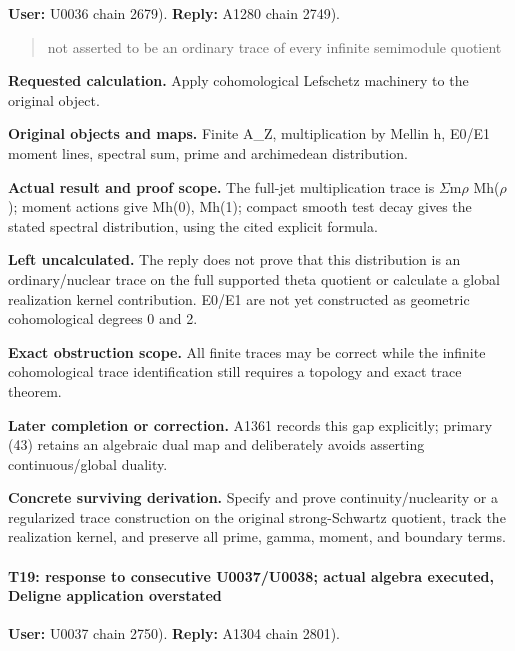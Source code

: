 \textbf{User:} U0036
\protect{} chain 2679).
\textbf{Reply:} A1280
\protect{} chain 2749).

\begin{quote}
not asserted to be an ordinary trace of every infinite semimodule
quotient
\end{quote}

\textbf{Requested calculation.} Apply cohomological Lefschetz machinery
to the original object.

\textbf{Original objects and maps.} Finite A\_Z, multiplication by
Mellin h, E0/E1 moment lines, spectral sum, prime and archimedean
distribution.

\textbf{Actual result and proof scope.} The full-jet multiplication
trace is
\allowbreak{}\ensuremath{Σ}\allowbreak{}m\allowbreak{}\ensuremath{ρ}\allowbreak{}
Mh(\allowbreak{}\ensuremath{ρ}\allowbreak{}); moment actions give Mh(0),
Mh(1); compact smooth test decay gives the stated spectral distribution,
using the cited explicit formula.

\textbf{Left uncalculated.} The reply does not prove that this
distribution is an ordinary/nuclear trace on the full supported theta
quotient or calculate a global realization kernel contribution. E0/E1
are not yet constructed as geometric cohomological degrees 0 and 2.

\textbf{Exact obstruction scope.} All finite traces may be correct while
the infinite cohomological trace identification still requires a
topology and exact trace theorem.

\textbf{Later completion or correction.} A1361 records this gap
explicitly; primary (43) retains an algebraic dual map and deliberately
avoids asserting continuous/global duality.

\textbf{Concrete surviving derivation.} Specify and prove
continuity/nuclearity or a regularized trace construction on the
original strong-Schwartz quotient, track the realization kernel, and
preserve all prime, gamma, moment, and boundary terms.

\paragraph{T19: response to consecutive U0037/U0038; actual algebra
executed, Deligne application
overstated}\label{t19-response-to-consecutive-u0037u0038-actual-algebra-executed-deligne-application-overstated}

\textbf{User:} U0037
\protect{} chain 2750).
\textbf{Reply:} A1304
\protect{} chain 2801).

